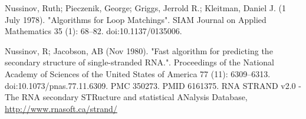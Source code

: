 \documentclass[paper=a4, fontsize=11pt]{scrartcl} %
\numberwithin{equation}{section} %
\numberwithin{figure}{section} %
\numberwithin{table}{section} %
\begin{document}
\begin{thebibliography}{1}

Nussinov, Ruth; Pieczenik, George; Griggs, Jerrold R.; Kleitman, Daniel J. (1 July 1978). "Algorithms for Loop Matchings". SIAM Journal on Applied Mathematics 35 (1): 68–82. doi:10.1137/0135006.

Nussinov, R; Jacobson, AB (Nov 1980). "Fast algorithm for predicting the secondary structure of single-stranded RNA.". Proceedings of the National Academy of Sciences of the United States of America 77 (11): 6309–6313. doi:10.1073/pnas.77.11.6309. PMC 350273. PMID 6161375.
RNA STRAND v2.0 - The RNA secondary STRucture and statistical ANalysis Database,
\url{http://www.rnasoft.ca/strand/}


\end{thebibliography}
\end{document}
